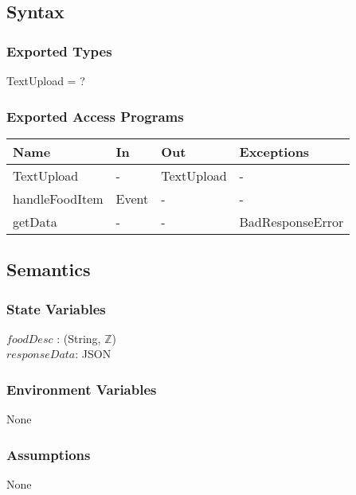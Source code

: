 \documentclass[12pt, titlepage]{article}
\begin{document}
\subsection{Syntax}
\subsubsection{Exported Types}
TextUpload = ?
\subsubsection{Exported Access Programs}
\begin{center}
	\begin{tabular}{p{3cm} p{4cm} p{4cm} p{2cm}}
		\hline
		\textbf{Name} & \textbf{In} & \textbf{Out} & \textbf{Exceptions} \\
		\hline
		TextUpload & - & TextUpload & - \\
		handleFoodItem & Event & - & - \\
		getData & - & - & BadResponseError \\
		\hline
	\end{tabular}
\end{center}
\subsection{Semantics}
\subsubsection{State Variables}
$foodDesc$ : (String, $\mathbb{Z}$)\\
$responseData$: JSON
\subsubsection{Environment Variables}
None
\subsubsection{Assumptions}
None
\end{document}
